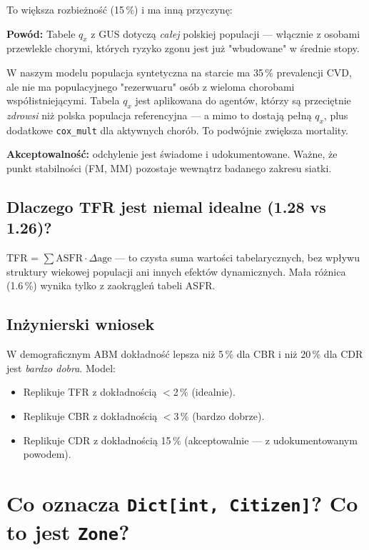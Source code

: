 \documentclass[11pt,a4paper]{article}
\begin{document}
To większa rozbieżność (15\,\%) i ma inną przyczynę:

\begin{warnbox}
\textbf{Powód:} Tabele $q_x$ z GUS dotyczą \emph{całej} polskiej populacji --- włącznie z osobami przewlekle chorymi, których ryzyko zgonu jest już "wbudowane" w średnie stopy.

W naszym modelu populacja syntetyczna na starcie ma 35\,\% prevalencji CVD, ale nie ma populacyjnego "rezerwuaru" osób z wieloma chorobami współistniejącymi. Tabela $q_x$ jest aplikowana do agentów, którzy są przeciętnie \emph{zdrowsi} niż polska populacja referencyjna --- a mimo to dostają pełną $q_x$, plus dodatkowe \texttt{cox\_mult} dla aktywnych chorób. To podwójnie zwiększa mortality.

\textbf{Akceptowalność:} odchylenie jest świadome i udokumentowane. Ważne, że punkt stabilności (FM, MM) pozostaje wewnątrz badanego zakresu siatki.
\end{warnbox}

\subsection{Dlaczego TFR jest niemal idealne (1.28 vs 1.26)?}

TFR = $\sum \text{ASFR} \cdot \Delta\text{age}$ --- to czysta suma wartości tabelarycznych, bez wpływu struktury wiekowej populacji ani innych efektów dynamicznych. Mała różnica (1.6\,\%) wynika tylko z zaokrągleń tabeli ASFR.

\subsection{Inżynierski wniosek}

W demograficznym ABM dokładność lepsza niż 5\,\% dla CBR i niż 20\,\% dla CDR jest \emph{bardzo dobra}. Model:
\begin{itemize}
  \item Replikuje TFR z dokładnością $<$2\,\% (idealnie).
  \item Replikuje CBR z dokładnością $<$3\,\% (bardzo dobrze).
  \item Replikuje CDR z dokładnością 15\,\% (akceptowalnie --- z udokumentowanym powodem).
\end{itemize}

\newpage
\section{Co oznacza \texttt{Dict[int, Citizen]}? Co to jest \texttt{Zone}?}
\end{document}
